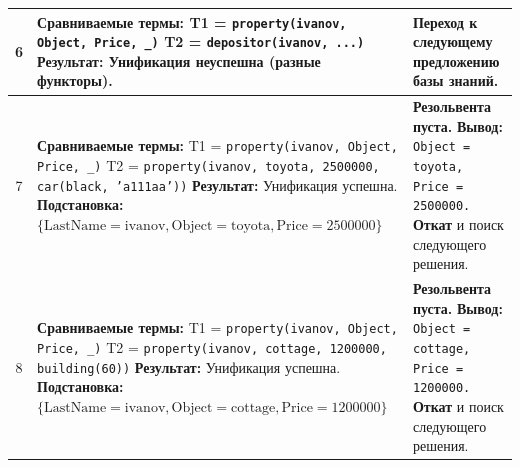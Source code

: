 \begin{tabularx}{\textwidth}{|c|X|X|}
	6                                                                                                   &
	\textbf{Сравниваемые термы:} \newline
	T1 = \texttt{property(ivanov, Object, Price, \_)} \newline
	T2 = \texttt{depositor(ivanov, ...)} \newline
	\textbf{Результат:} Унификация неуспешна (разные функторы).                                         &
	Переход к следующему предложению базы знаний.                                                                                                                                                                  \\
	\hline

	7                                                                                                   &
	\textbf{Сравниваемые термы:} \newline
	T1 = \texttt{property(ivanov, Object, Price, \_)} \newline
	T2 = \texttt{property(ivanov, toyota, 2500000, car(black, 'a111aa'))} \newline
	\textbf{Результат:} Унификация успешна. \newline
	\textbf{Подстановка:} \newline
	$\{\text{LastName}=\text{ivanov}, \text{Object}=\text{toyota}, \text{Price}=2500000\}$              &
	\textbf{Резольвента пуста.} \newline
	\textbf{Вывод:} \newline
	\texttt{Object = toyota, Price = 2500000.} \newline
	\textbf{Откат} и поиск следующего решения.                                                                                                                                                                     \\
	\hline

	8                                                                                                   &
	\textbf{Сравниваемые термы:} \newline
	T1 = \texttt{property(ivanov, Object, Price, \_)} \newline
	T2 = \texttt{property(ivanov, cottage, 1200000, building(60))} \newline
	\textbf{Результат:} Унификация успешна. \newline
	\textbf{Подстановка:} \newline
	$\{\text{LastName}=\text{ivanov}, \text{Object}=\text{cottage}, \text{Price}=1200000\}$             &
	\textbf{Резольвента пуста.} \newline
	\textbf{Вывод:} \newline
	\texttt{Object = cottage, Price = 1200000.} \newline
	\textbf{Откат} и поиск следующего решения.                                                                                                                                                                     \\
	\hline


\end{tabularx}
